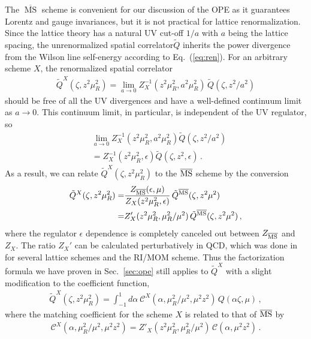 \documentclass[prd,aps,twocolumn,preprintnumbers,showpacs,nofootinbib,superscriptaddress,notitlepage]{revtex4-1}
\newcommand{\nn}{\nonumber}
\newcommand{\spcorr}{spatial correlator\xspace}
\begin{document}
The $\overline{\ensuremath{\operatorname{MS}}}$ scheme is convenient for our discussion of the OPE as it guarantees Lorentz and gauge invariances, but it is not practical for lattice renormalization. Since the lattice theory has a natural UV cut-off $1/a$ with $a$ being the lattice spacing, the unrenormalized \spcorr $\tilde{Q}$ inherits the power divergence from the Wilson line self-energy according to Eq.~(\ref{eq:ren}). For an arbitrary scheme $X$, the renormalized \spcorr
\begin{align}
\tilde{Q}^X(\zeta,z^2\mu^2_R)
  = \lim_{a\to0} Z^{-1}_X(z^2\mu_R^2,a^2\mu^2_R)\, \tilde{Q}(\zeta,z^2/a^2)
\end{align}
should be free of all the UV divergences and have a well-defined continuum limit as $a\to0$. This continuum limit, in particular, is independent of the UV regulator, so
\begin{align}
&\lim_{a\to0} Z^{-1}_X(z^2\mu_R^2,a^2\mu^2_R)\tilde{Q}(\zeta,z^2/a^2) \nn\\
&= Z^{-1}_X(z^2\mu^2_R,\epsilon)\tilde{Q}(\zeta,z^2,\epsilon)\,.
\end{align}
As a result, we can relate $\tilde{Q}^X(\zeta,z^2\mu^2_R)$ to the $\overline{\rm MS}$ scheme by the conversion
\begin{align}
\tilde{Q}^X(\zeta,z^2\mu^2_R) =& \frac{Z_{\overline{\rm MS}}(\epsilon,\mu)}{Z_X(z^2\mu^2_R,\epsilon)}\, \tilde{Q}^{\overline{\rm MS}}(\zeta,z^2\mu^2)\nn\\
=& Z'_X(z^2\mu_R^2,\mu_R^2/\mu^2)\, \tilde{Q}^{\overline{\rm MS}}(\zeta,z^2\mu^2)\,,
\end{align}
where the regulator $\epsilon$ dependence is completely canceled out between $Z_{\overline{\rm MS}}$ and $Z_X$. The ratio $Z_X'$ can be calculated perturbatively in QCD, which was done in~\cite{Constantinou:2017sej} for several lattice schemes and the RI/MOM scheme. Thus the factorization formula we have proven in Sec.~\ref{sec:ope} still applies to $\tilde{Q}^X$ with a slight modification to the coefficient function,
\begin{align}
\tilde{Q}^X(\zeta,z^2\mu^2_R)
 = \int_{-1}^1 \!\! d\alpha \:
   \mathcal{C}^X(\alpha,\mu_R^2/\mu^2,\mu^2 z^2)\, Q(\alpha\zeta,\mu)\,,
\end{align}
where the matching coefficient for the scheme $X$ is related to that of $\overline{\rm MS}$ by
\begin{align}
\mathcal{C}^X(\alpha,\mu_R^2/\mu^2,\mu^2 z^2) = Z'_X(z^2\mu_R^2,\mu_R^2/\mu^2)\, \mathcal{C}(\alpha,\mu^2 z^2) \,.
\end{align}
\end{document}
